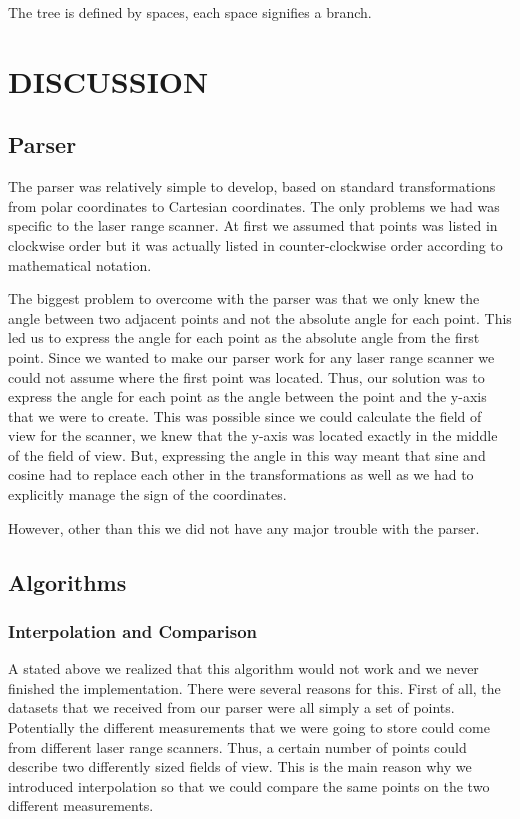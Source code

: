 \documentclass[a4paper, 10pt, conference]{ieeeconf}      %
\begin{document}
The tree is defined by spaces, each space signifies a branch.

\section{DISCUSSION}

\subsection{Parser}
The parser was relatively simple to develop, based on standard transformations from polar coordinates to Cartesian coordinates. The only problems we had was specific to the laser range scanner. At first we assumed that points was listed in clockwise order but it was actually listed in counter-clockwise order according to mathematical notation.

The biggest problem to overcome with the parser was that we only knew the angle between two adjacent points and not the absolute angle for each point. This led us to express the angle for each point as the absolute angle from the first point. Since we wanted to make our parser work for any laser range scanner we could not assume where the first point was located. Thus, our solution was to express the angle for each point as the angle between the point and the y-axis that we were to create. This was possible since we could calculate the field of view for the scanner, we knew that the y-axis was located exactly in the middle of the field of view. But, expressing the angle in this way meant that sine and cosine had to replace each other in the transformations as well as we had to explicitly manage the sign of the coordinates.

However, other than this we did not have any major trouble with the parser.

\subsection{Algorithms}

\subsubsection{Interpolation and Comparison}
A stated above we realized that this algorithm would not work and we never finished the implementation. There were several reasons for this. First of all, the datasets that we received from our parser were all simply a set of points. Potentially the different measurements that we were going to store could come from different laser range scanners. Thus, a certain number of points could describe two differently sized fields of view. This is the main reason why we introduced interpolation so that we could compare the same points on the two different measurements.
\end{document}
